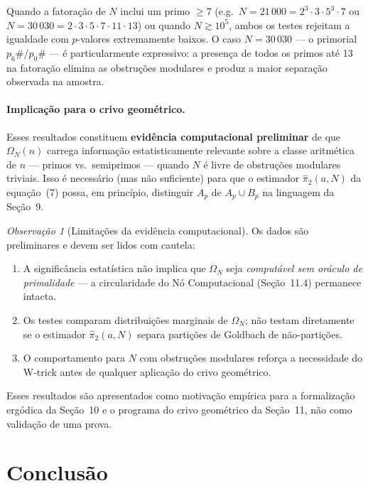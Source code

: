 \documentclass[12pt,a4paper]{article}
\theoremstyle{remark}
\newtheorem{remark}[theorem]{Observa\c{c}\~ao}
\begin{document}
	Quando a fatoração de $N$ inclui um primo $\geq 7$ (e.g.\ $N = 21\,000 =
	2^3\cdot3\cdot5^3\cdot7$ ou $N = 30\,030 = 2\cdot3\cdot5\cdot7\cdot11\cdot13$)
	ou quando $N \gtrsim 10^5$, ambos os testes rejeitam a igualdade com
	$p$-valores extremamente baixos. O caso $N = 30\,030$ — o primorial
	$p_6\# / p_0\#$ — é particularmente expressivo: a presença de todos os
	primos até 13 na fatoração elimina as obstruções modulares e produz a maior
	separação observada na amostra.
	
	\paragraph{Implicação para o crivo geométrico.}
	Esses resultados constituem \textbf{evidência computacional preliminar} de que
	$\Omega_N(n)$ carrega informação estatisticamente relevante sobre a classe
	aritmética de $n$ — primos vs.\ semiprimos — quando $N$ é livre de obstruções
	modulares triviais. Isso é necessário (mas não suficiente) para que o estimador
	$\hat{\pi}_2(a, N)$ da equação~(7) possa, em princípio, distinguir $A_p$ de
	$A_p \cup B_p$ na linguagem da Seção~9.
	
	\begin{remark}[Limitações da evidência computacional]
		Os dados são preliminares e devem ser lidos com cautela:
		\begin{enumerate}
			\item A significância estatística não implica que $\Omega_N$ seja
			\emph{computável sem oráculo de primalidade} — a circularidade do Nó
			Computacional (Seção~11.4) permanece intacta.
			\item Os testes comparam distribuições marginais de $\Omega_N$; não testam
			diretamente se o estimador $\hat{\pi}_2(a,N)$ separa partições de Goldbach
			de não-partições.
			\item O comportamento para $N$ com obstruções modulares reforça a necessidade
			do W-trick antes de qualquer aplicação do crivo geométrico.
		\end{enumerate}
		Esses resultados são apresentados como motivação empírica para a formalização
		ergódica da Seção~10 e o programa do crivo geométrico da Seção~11, não como
		validação de uma prova.
	\end{remark}
	
	
	\section{Conclus\~ao}
	
\end{document}
